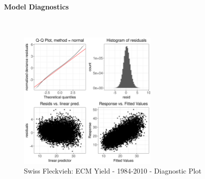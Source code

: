 \paragraph{Model Diagnostics} \quad \\
\begin{figure}[H]
    \centering
    \includegraphics[width=0.6\textwidth]{thesis/figures/models/ecm/before2010/sf_ecm_before2010/sf_ecm_before2010_diagnostics.png}
    \caption[]{Swiss Fleckvieh: ECM Yield - 1984-2010 - Diagnostic Plot}
\end{figure}

\newpage
